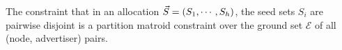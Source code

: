 

\begin{lemma}\label{lem:matroid}
The constraint that in an allocation $\vec{S} = (S_1, \cdots, S_h)$, the seed sets $S_i$ are pairwise disjoint is a partition matroid constraint over the ground set $\mathcal{E}$ of all (node, advertiser) pairs.
\end{lemma}

